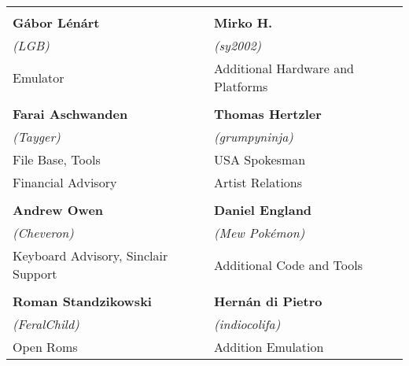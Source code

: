 \begin{tabular}{ll}
& \\
{\large\bf Gábor Lénárt}                & {\large\bf Mirko H.} \\
 \textit{(LGB)}                         & \textit{(sy2002)} \\
Emulator                                & Additional Hardware and Platforms \\
& \\
{\large\bf Farai Aschwanden}            & {\large\bf Thomas Hertzler} \\
 \textit{(Tayger)}                      & \textit{(grumpyninja)} \\
File Base, Tools                        & USA Spokesman \\
Financial Advisory                      & Artist Relations \\
& \\
{\large\bf Andrew Owen}                 & {\large\bf Daniel England} \\
 \textit{(Cheveron)}                    & \textit{(Mew Pokémon)} \\
Keyboard Advisory, Sinclair Support     & Additional Code and Tools \\
& \\
{\large\bf Roman Standzikowski}         & {\large\bf Hernán di Pietro} \\
 \textit{(FeralChild)}                  & \textit{(indiocolifa)} \\
Open Roms                               & Addition Emulation \\
\end{tabular}

